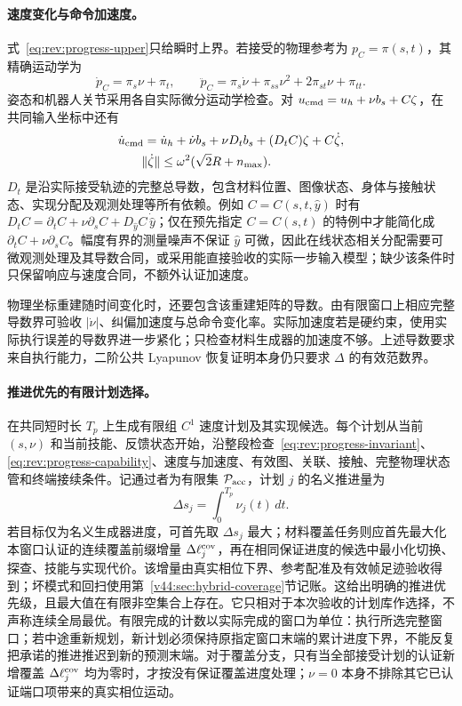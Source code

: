 \documentclass[11pt,a4paper]{article}
\numberwithin{equation}{section}
\theoremstyle{definition}
\begin{document}
\paragraph{速度变化与命令加速度。}
式~\eqref{eq:rev:progress-upper}只给瞬时上界。若接受的物理参考为 $p_C=\pi(s,t)$，其精确运动学为
\begin{equation}
 \dot p_C=\pi_s\nu+\pi_t,\qquad
 \ddot p_C=\pi_s\dot\nu+\pi_{ss}\nu^2+2\pi_{st}\nu+\pi_{tt}.
 \label{eq:rev:physical-progress-acceleration}
\end{equation}
姿态和机器人关节采用各自实际微分运动学检查。对 $u_{\rm cmd}=u_h+\nu b_s+C\zeta$，在共同输入坐标中还有
\begin{align}
 \dot u_{\rm cmd}
 ={}&\dot u_h+\dot\nu b_s+\nu D_t b_s+(D_t C)\zeta+C\dot\zeta,\\
 \|\dot\zeta\|&\le\omega^2(\sqrt2R+n_{\max}).
 \label{eq:rev:command-acceleration}
\end{align}
$D_t$ 是沿实际接受轨迹的完整总导数，包含材料位置、图像状态、身体与接触状态、实现分配及观测处理等所有依赖。例如 $C=C(s,t,\widehat y)$ 时有 $D_tC=\partial_tC+\nu\partial_sC+D_{\widehat y}C\,\dot{\widehat y}$；仅在预先指定 $C=C(s,t)$ 的特例中才能简化成 $\partial_tC+\nu\partial_sC$。幅度有界的测量噪声不保证 $\widehat y$ 可微，因此在线状态相关分配需要可微观测处理及其导数合同，或采用能直接验收的实际一步输入模型；缺少该条件时只保留响应与速度合同，不额外认证加速度。

物理坐标重建随时间变化时，还要包含该重建矩阵的导数。由有限窗口上相应完整导数界可验收 $|\dot\nu|$、纠偏加速度与总命令变化率。实际加速度若是硬约束，使用实际执行误差的导数界进一步紧化；只检查材料生成器的加速度不够。上述导数要求来自执行能力，二阶公共 Lyapunov 恢复证明本身仍只要求 $\Delta$ 的有效范数界。

\paragraph{推进优先的有限计划选择。}
在共同短时长 $T_p$ 上生成有限组 $C^1$ 速度计划及其实现候选。每个计划从当前 $(s,\nu)$ 和当前技能、反馈状态开始，沿整段检查~\eqref{eq:rev:progress-invariant}、\eqref{eq:rev:progress-capability}、速度与加速度、有效图、关联、接触、完整物理状态管和终端接续条件。记通过者为有限集 $\mathcal P_{\rm acc}$，计划 $j$ 的名义推进量为
\begin{equation}
 \Delta s_j=\int_0^{T_p}\nu_j(t)\,dt.
\end{equation}
若目标仅为名义生成器进度，可首先取 $\Delta s_j$ 最大；材料覆盖任务则应首先最大化本窗口认证的连续覆盖前缀增量 $\Delta\ell_j^{\rm cov}$，再在相同保证进度的候选中最小化切换、探查、技能与实现代价。该增量由真实相位下界、参考配准及有效帧足迹验收得到；坏模式和回扫使用第~\ref{v44:sec:hybrid-coverage}节记账。这给出明确的推进优先级，且最大值在有限非空集合上存在。它只相对于本次验收的计划库作选择，不声称连续全局最优。有限完成的计数以实际完成的窗口为单位：执行所选完整窗口；若中途重新规划，新计划必须保持原指定窗口末端的累计进度下界，不能反复把承诺的推进推迟到新的预测末端。对于覆盖分支，只有当全部接受计划的认证新增覆盖 $\Delta\ell_j^{\rm cov}$ 均为零时，才按没有保证覆盖进度处理；$\nu=0$ 本身不排除其它已认证端口项带来的真实相位运动。
\end{document}
